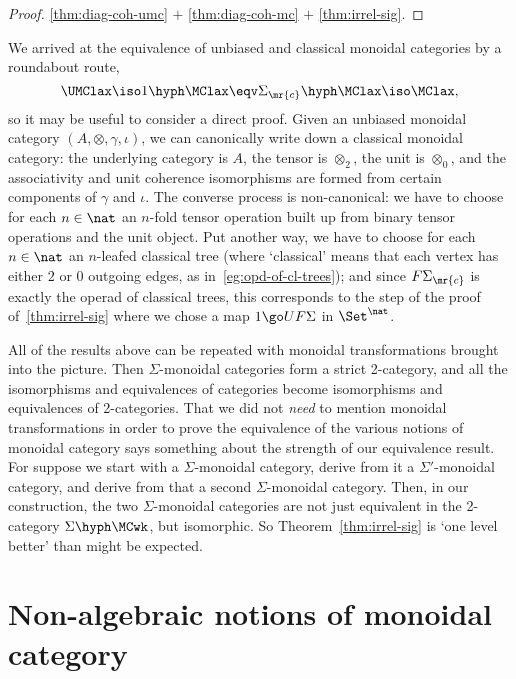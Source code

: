 \begin{proof}
\ref{thm:diag-coh-umc} $+$ \ref{thm:diag-coh-mc} $+$ \ref{thm:irrel-sig}.
\done
\end{proof}

We arrived at the equivalence of unbiased and classical monoidal categories
by a roundabout route,
\[
\UMClax \iso 1\hyph\MClax \eqv \Sigma_\mr{c}\hyph\MClax \iso \MClax,
\]
so it may be useful to consider a direct proof.  Given an unbiased monoidal
category $(A, \otimes, \gamma, \iota)$, we can canonically write down a
classical monoidal category: the underlying category is $A$, the tensor is
$\otimes_2$, the unit is $\otimes_0$, and the associativity and unit
coherence isomorphisms are formed from certain components of $\gamma$ and
$\iota$.  The converse process is non-canonical:
%
%
we have to choose for each $n\in\nat$ an $n$-fold tensor operation built up
from binary tensor operations and the unit object.  Put another way, we
have to choose for each $n\in\nat$ an $n$-leafed classical tree (where
`classical' means that each vertex has either $2$ or $0$ outgoing edges, as
in~\ref{eg:opd-of-cl-trees}); and since $F\Sigma_\mr{c}$ is exactly the
operad of classical trees, this corresponds to the step of the proof
of~\ref{thm:irrel-sig} where we chose a map $1 \go UF\Sigma$ in
$\Set^\nat$.

All of the results above can be repeated with monoidal transformations
brought into the picture.  Then $\Sigma$-monoidal categories form a strict
2-category, and all the isomorphisms and equivalences of categories become
isomorphisms and equivalences of 2-categories.  That we did not \emph{need}
to mention monoidal transformations in order to prove the equivalence of
the various notions of monoidal category says something about the strength
of our equivalence result.  For suppose we start with a $\Sigma$-monoidal
category, derive from it a $\Sigma'$-monoidal category, and derive from
that a second $\Sigma$-monoidal category.  Then, in our construction, the
two $\Sigma$-monoidal categories are not just equivalent in the 2-category
$\Sigma\hyph\MCwk$, but isomorphic.  So Theorem~\ref{thm:irrel-sig} is `one
level%
%
%
better' than might be expected.











\section{Non-algebraic notions of monoidal category}


